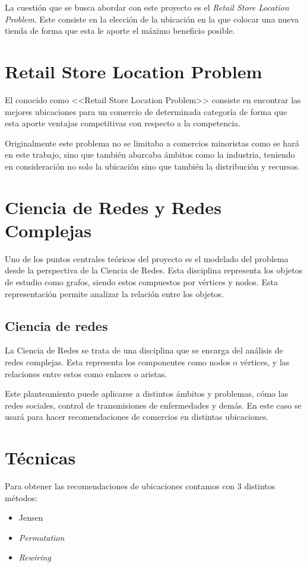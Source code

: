 
La cuestión que se busca abordar con este proyecto es el \textit{Retail Store Location Problem}. Este consiste
en la elección de la ubicación en la que colocar una nueva tienda de forma que esta le aporte el máximo beneficio posible.

\section{Retail Store Location Problem}

El conocido como <<Retail Store Location Problem>> consiste en encontrar
las mejores ubicaciones para un comercio de determinada categoría de forma 
que esta aporte ventajas competitivas con respecto a la competencia.

Originalmente este problema no se limitaba a comercios minoristas como se hará en este
trabajo, sino que también abarcaba ámbitos como la industria, teniendo en consideración
no solo la ubicación sino que también la distribución y recursos.


\section{Ciencia de Redes y Redes Complejas}
Uno de los puntos centrales teóricos del proyecto es el modelado del problema desde la
perspectiva de la Ciencia de Redes. Esta disciplina representa los objetos de estudio
como grafos, siendo estos compuestos por vértices y nodos. Esta representación permite analizar
la relación entre los objetos.

\subsection{Ciencia de redes}
La Ciencia de Redes se trata de una disciplina que se encarga del análisis de redes complejas. Esta representa los componentes como nodos o vértices, y las relaciones entre
estos como enlaces o aristas.

Este planteamiento puede aplicarse a distintos ámbitos y problemas, cómo las redes sociales,
control de transmisiones de enfermedades y demás. En este caso se usará para hacer recomendaciones de comercios en distintas ubicaciones.


\section{Técnicas}
Para obtener las recomendaciones de ubicaciones contamos con 3 distintos métodos:
\begin{itemize}
	\item Jensen
	\item \textit{Permutation}
	\item \textit{Rewiring}
\end{itemize}

